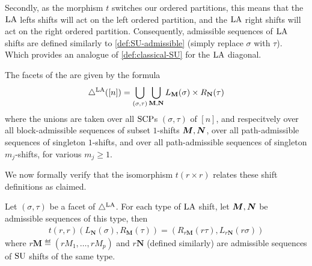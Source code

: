 Secondly, as the morphism $t$ switches our ordered partitions, this means that the $\mathrm{LA}$ lefts shifts will act on the left ordered partition, and the $\mathrm{LA}$ right shifts will act on the right ordered partition.
Consequently, admissible sequences of $\mathrm{LA}$ shifts are defined similarly to \cref{def:SU-admissible} (simply replace $\sigma$ with $\tau$).
Which provides an analogue of \cref{def:classical-SU} for the $\mathrm{LA}$ diagonal. 

\begin{definition}
\label{def:classical-LA}
The facets of the  are given by the formula
\begin{align*}
\triangle^{\mathrm{LA}}([n]) = \bigcup_{(\sigma,\tau)} \bigcup_{\mathbf{M}, \mathbf{N}} L_\mathbf{M}(\sigma)\times R_\mathbf{N}(\tau)
\end{align*}
where the unions are taken over all $\mathrm{SCP}$s $(\sigma, \tau)$ of $[n]$, and respecitvely over all block-admissible sequences of subset $1$-shifts $\boldsymbol{M},\boldsymbol{N}$, over all path-admissible sequences of singleton $1$-shifts, and over all path-admissible sequences of singleton $m_j$-shifts, for various $m_j \ge 1$.
\end{definition}

We now formally verify that the isomorphism $t(r\times r)$ relates these shift definitions as claimed.

\begin{proposition} 
\label{prop:trr is an isomorphism of shifts}
Let $(\sigma,\tau)$ be a facet of $\triangle^{\mathrm{LA}}$.
For each type of $\mathrm{LA}$ shift, let $\boldsymbol{M},\boldsymbol{N}$ be admissible sequences of this type, then 
\begin{align*}
t(r,r)(L_\mathbf{N}(\sigma), R_\mathbf{M}(\tau)) = (R_{r\mathbf{M}}(r\tau), L_{r\mathbf{N}}(r\sigma))
\end{align*}
where $r\mathbf{M} \eqdef (rM_{1},\dots,rM_{p})$ and $r\mathbf{N}$ (defined similarly) are admissible sequences of $\mathrm{SU}$ shifts of the same type.
\end{proposition}

